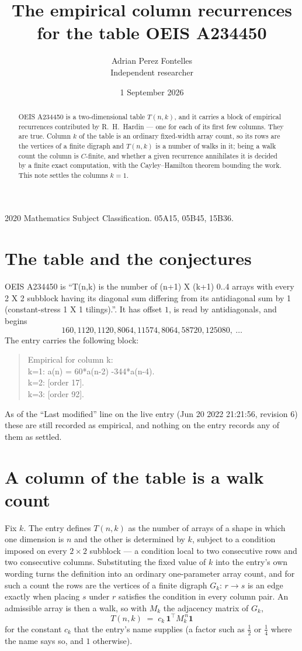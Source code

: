 \documentclass[11pt,a4paper]{article}
\title{The empirical column recurrences for the table OEIS A234450}
\author{Adrian Perez Fontelles\\ \small Independent researcher}
\date{1 September 2026}
\theoremstyle{plain}
\theoremstyle{definition}
\begin{document}
\maketitle

\begin{abstract}
OEIS A234450 is a two-dimensional table $T(n,k)$, and it carries a block of empirical
recurrences contributed by R.~H.~Hardin --- one for each of its first few columns. They are
true. Column $k$ of the table is an ordinary fixed-width array count, so its rows are the
vertices of a finite digraph and $T(n,k)$ is a number of walks in it; being a walk count the
column is $C$-finite, and whether a given recurrence annihilates it is decided by a finite
exact computation, with the Cayley--Hamilton theorem bounding the work. This note settles the columns $k=1$.
\end{abstract}

\noindent\small 2020 Mathematics Subject Classification. 05A15, 05B45, 15B36.\normalsize

\section{The table and the conjectures}

OEIS A234450 is ``T(n,k) is the number of (n+1) X (k+1) 0..4 arrays with every 2 X 2 subblock having its diagonal sum differing from its antidiagonal sum by 1 (constant-stress 1 X 1 tilings).''. It has offset $1$, is
read by antidiagonals, and begins
\[
160, 1120, 1120, 8064, 11574, 8064, 58720, 125080,\ \dots
\]
The entry carries the following block:
\begin{quote}\small
Empirical for column k:\\
k=1: a(n) = 60*a(n-2) -344*a(n-4).\\
k=2: [order 17].\\
k=3: [order 92].\\
\end{quote}
As of the ``Last modified'' line on the live entry (Jun 20 2022 21:21:56, revision 6) these are still
recorded as empirical, and nothing on the entry records any of them as settled.

\section{A column of the table is a walk count}

Fix $k$. The entry defines $T(n,k)$ as the number of arrays of a shape in which one dimension
is $n$ and the other is determined by $k$, subject to a condition imposed on every
$2\times2$ subblock --- a condition local to two consecutive rows and two consecutive columns.
Substituting the fixed value of $k$ into the entry's own wording turns the definition into an
ordinary one-parameter array count, and for such a count the rows are the vertices of a finite
digraph $G_k$: $r\to s$ is an edge exactly when placing $s$ under $r$ satisfies the condition
in every column pair. An admissible array is then a walk, so with $M_k$ the adjacency matrix
of $G_k$,
\[
T(n,k)\;=\;c_k\,\mathbf{1}^{\!\top}M_k^{\,n}\mathbf{1}
\]
for the constant $c_k$ that the entry's name supplies (a factor such as $\tfrac12$ or
$\tfrac14$ where the name says so, and $1$ otherwise).
\end{document}
